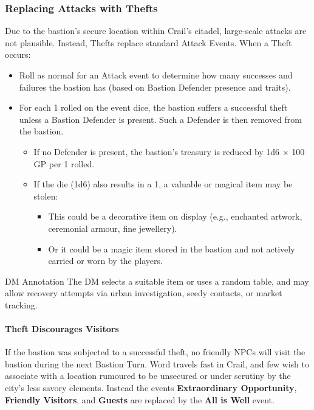 \subsubsection*{Replacing Attacks with Thefts}
{\entryfont Due to the bastion's secure location within Crail's citadel, large-scale attacks are not plausible. Instead, Thefts replace standard Attack Events. When a Theft occurs:
\begin{itemize}
	\item Roll as normal for an Attack event to determine how many successes and failures the bastion has (based on Bastion Defender presence and traits).
	\item For each 1 rolled on the event dice, the bastion suffers a successful theft unless a Bastion Defender is present. Such a Defender is then removed from the bastion.
	\begin{itemize}
		\item If no Defender is present, the bastion's treasury is reduced by 1d6 × 100 GP per 1 rolled.
		\item If the die (1d6) also results in a 1, a valuable or magical item may be stolen:
		\begin{itemize}
			\item This could be a decorative item on display (e.g., enchanted artwork, ceremonial armour, fine jewellery).
			\item Or it could be a magic item stored in the bastion and not actively carried or worn by the players.
		\end{itemize}
	\end{itemize}
\end{itemize}
}
\begingroup
	\DndSetThemeColor[PhbTan]
	\begin{DndComment}{DM Annotation}
		The DM selects a suitable item or uses a random table, and may allow recovery attempts via urban investigation, seedy contacts, or market tracking.
	\end{DndComment}
\endgroup
\paragraph*{Theft Discourages Visitors}
{\entryfont If the bastion was subjected to a successful theft, no friendly NPCs will visit the bastion during the next Bastion Turn. Word travels fast in Crail, and few wish to associate with a location rumoured to be unsecured or under scrutiny by the city's less savory elements. Instead the events \textbf{Extraordinary Opportunity}, \textbf{Friendly Visitors}, and \textbf{Guests} are replaced by the \textbf{All is Well} event.}

